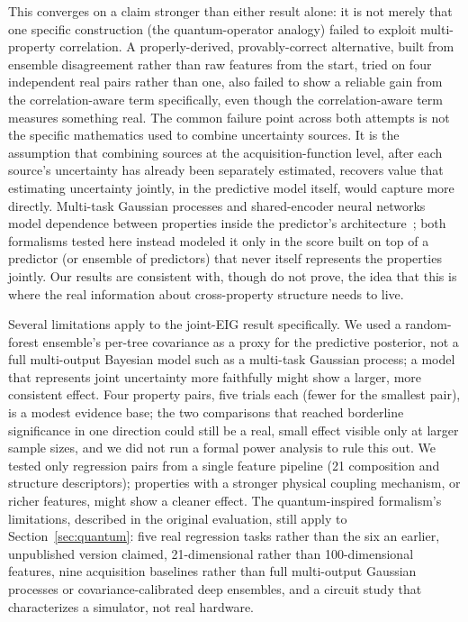 \documentclass[10pt]{article}
\begin{document}
This converges on a claim stronger than either result alone: it is not merely that one specific construction (the quantum-operator analogy) failed to exploit multi-property correlation. A properly-derived, provably-correct alternative, built from ensemble disagreement rather than raw features from the start, tried on four independent real pairs rather than one, also failed to show a reliable gain from the correlation-aware term specifically, even though the correlation-aware term measures something real. The common failure point across both attempts is not the specific mathematics used to combine uncertainty sources. It is the assumption that combining sources at the acquisition-function level, after each source's uncertainty has already been separately estimated, recovers value that estimating uncertainty jointly, in the predictive model itself, would capture more directly. Multi-task Gaussian processes and shared-encoder neural networks model dependence between properties inside the predictor's architecture~\cite{rasmussen2006gaussian,snoek2012practical}; both formalisms tested here instead modeled it only in the score built on top of a predictor (or ensemble of predictors) that never itself represents the properties jointly. Our results are consistent with, though do not prove, the idea that this is where the real information about cross-property structure needs to live.

Several limitations apply to the joint-EIG result specifically. We used a random-forest ensemble's per-tree covariance as a proxy for the predictive posterior, not a full multi-output Bayesian model such as a multi-task Gaussian process; a model that represents joint uncertainty more faithfully might show a larger, more consistent effect. Four property pairs, five trials each (fewer for the smallest pair), is a modest evidence base; the two comparisons that reached borderline significance in one direction could still be a real, small effect visible only at larger sample sizes, and we did not run a formal power analysis to rule this out. We tested only regression pairs from a single feature pipeline (21 composition and structure descriptors); properties with a stronger physical coupling mechanism, or richer features, might show a cleaner effect. The quantum-inspired formalism's limitations, described in the original evaluation, still apply to Section~\ref{sec:quantum}: five real regression tasks rather than the six an earlier, unpublished version claimed, 21-dimensional rather than 100-dimensional features, nine acquisition baselines rather than full multi-output Gaussian processes or covariance-calibrated deep ensembles, and a circuit study that characterizes a simulator, not real hardware.
\end{document}
